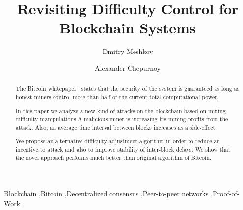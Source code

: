 \documentclass[number,preprint,review]{elsarticle}
\begin{document}
\begin{frontmatter}



\title{Revisiting Difficulty Control for Blockchain Systems}



\author[iohk]{Dmitry Meshkov}
\address[iohk]{IOHK Research}

\author[iohk]{Alexander Chepurnoy}
\address[iohk]{IOHK Research}

\begin{abstract}

The Bitcoin whitepaper~\cite{Nakamoto2008} states that the security of the system is guaranteed as long as honest miners control more than half of the current total computational power.

In this paper we analyze a new kind of attacks on the blockchain based on mining difficulty manipulations.A malicious miner is increasing his mining profits from the attack. Also, an average time interval between blocks increases as a side-effect.

We propose an alternative difficulty adjustment algorithm in order to reduce an incentive to attack and also to improve stability of inter-block delays. We show that the novel approach performs much better than original algorithm of Bitcoin.

\end{abstract}

\begin{keyword}
Blockchain \sep Bitcoin \sep Decentralized consensus \sep Peer-to-peer networks \sep Proof-of-Work
\end{keyword}

\end{frontmatter}
\end{document}
